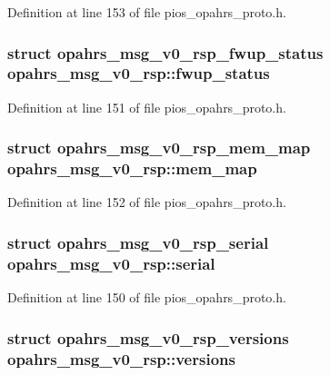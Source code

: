 Definition at line 153 of file pios\-\_\-opahrs\-\_\-proto.\-h.

\hypertarget{unionopahrs__msg__v0__rsp_aadc40205b8e74ec656cacab84ce68647}{
\subsubsection[{fwup\-\_\-status}]{\setlength{\rightskip}{0pt plus 5cm}struct {\bf opahrs\-\_\-msg\-\_\-v0\-\_\-rsp\-\_\-fwup\-\_\-status} opahrs\-\_\-msg\-\_\-v0\-\_\-rsp\-::fwup\-\_\-status}}\label{unionopahrs__msg__v0__rsp_aadc40205b8e74ec656cacab84ce68647}


Definition at line 151 of file pios\-\_\-opahrs\-\_\-proto.\-h.

\hypertarget{unionopahrs__msg__v0__rsp_a4fb22fb94f9d21be3764c9e947139f99}{
\subsubsection[{mem\-\_\-map}]{\setlength{\rightskip}{0pt plus 5cm}struct {\bf opahrs\-\_\-msg\-\_\-v0\-\_\-rsp\-\_\-mem\-\_\-map} opahrs\-\_\-msg\-\_\-v0\-\_\-rsp\-::mem\-\_\-map}}\label{unionopahrs__msg__v0__rsp_a4fb22fb94f9d21be3764c9e947139f99}


Definition at line 152 of file pios\-\_\-opahrs\-\_\-proto.\-h.

\hypertarget{unionopahrs__msg__v0__rsp_af9c00033181eeac6262ceaee211eb98c}{
\subsubsection[{serial}]{\setlength{\rightskip}{0pt plus 5cm}struct {\bf opahrs\-\_\-msg\-\_\-v0\-\_\-rsp\-\_\-serial} opahrs\-\_\-msg\-\_\-v0\-\_\-rsp\-::serial}}\label{unionopahrs__msg__v0__rsp_af9c00033181eeac6262ceaee211eb98c}


Definition at line 150 of file pios\-\_\-opahrs\-\_\-proto.\-h.

\hypertarget{unionopahrs__msg__v0__rsp_a8da6adc95543c720f2aba2c4796b5c18}{
\subsubsection[{versions}]{\setlength{\rightskip}{0pt plus 5cm}struct {\bf opahrs\-\_\-msg\-\_\-v0\-\_\-rsp\-\_\-versions} opahrs\-\_\-msg\-\_\-v0\-\_\-rsp\-::versions}}\label{unionopahrs__msg__v0__rsp_a8da6adc95543c720f2aba2c4796b5c18}


